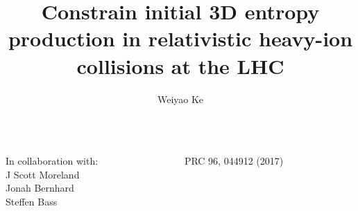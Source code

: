 \documentclass[11pt]{beamer}
\author[Weiyao Ke]{Weiyao Ke}
\title[3D Initial Condition]{Constrain initial 3D entropy production in relativistic heavy-ion collisions at the LHC}
\institute{\small \it Duke University}
\begin{document}
\begin{frame}
\titlepage
\begin{columns}
\begin{column}{0.65\textwidth}
In collaboration with:\\
\quad\quad J Scott Moreland\\
\quad\quad\hspace*{0.08cm} Jonah Bernhard \\
\quad\hspace*{0.31cm} Steffen Bass
\end{column}
\begin{column}{0.35\textwidth}
\small PRC 96, 044912 (2017)
\end{column}
\end{columns}
\end{frame}
\end{document}
